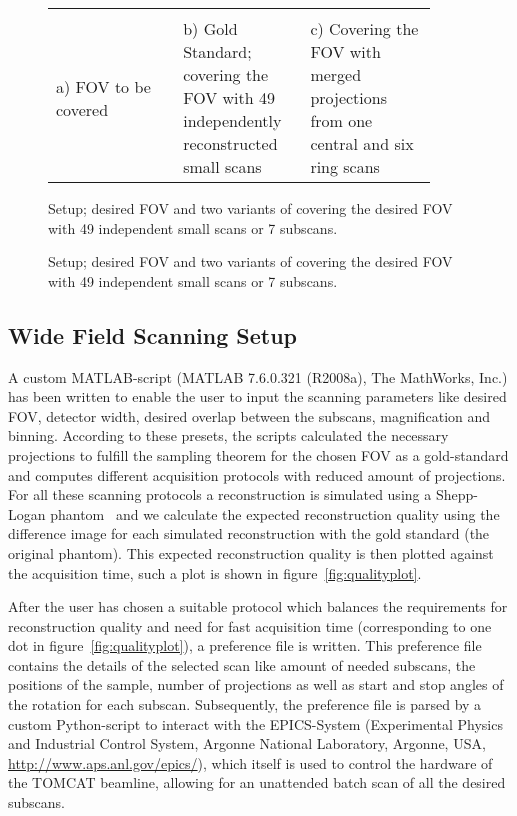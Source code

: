 \ifiucr
	\begin{figure}%
		\centering%
		\caption{Setup; desired FOV and two variants of covering the desired FOV with 49 independent small scans or 7 subscans.}%
		\begin{tabular}{p{0.3\linewidth}p{0.3\linewidth}p{0.3\linewidth}}%
			 &%
			 &%
			 \\%
			a) FOV to be covered &%
			b) Gold Standard; covering the FOV with 49 independently reconstructed small scans &%
			c) Covering the FOV with merged projections from one central and six ring scans \\%
		\end{tabular}%
		\label{fig:Setup7SubScans}%
	\end{figure}%
\else
	\begin{figure*}[htp]
		\centering%
		\caption{Setup; desired FOV and two variants of covering the desired FOV with 49 independent small scans or 7 subscans.}%
		\label{fig:Setup7SubScans}%
	\end{figure*}
\fi

\subsection{Wide Field Scanning Setup}%
\label{subsec:wfs-setup}%
A custom MATLAB-script (MATLAB\textsuperscript{\textregistered} 7.6.0.321 (R2008a), The MathWorks, Inc.) has been written to enable the user to input the scanning parameters like desired FOV, detector width, desired overlap between the subscans, magnification and binning. According to these presets, the scripts calculated the necessary projections to fulfill the sampling theorem for the chosen FOV as a gold-standard and computes different acquisition protocols with reduced amount of projections. For all these scanning protocols a reconstruction is simulated using a Shepp-Logan phantom~\cite{Shepp1974} and we calculate the expected reconstruction quality using the difference image for each simulated reconstruction with the gold standard (the original phantom). This expected reconstruction quality is then plotted against the acquisition time, such a plot is shown in figure~\ref{fig:qualityplot}.

After the user has chosen a suitable protocol which balances the requirements for reconstruction quality and need for fast acquisition time (corresponding to one dot in figure~\ref{fig:qualityplot}), a preference file is written. This preference file contains the details of the selected scan like amount of needed subscans, the positions of the sample, number of projections as well as start and stop angles of the rotation for each subscan. Subsequently, the preference file is parsed by a custom Python-script to interact with the EPICS-System (Experimental Physics and Industrial Control System, Argonne National Laboratory, Argonne, USA, \url{http://www.aps.anl.gov/epics/}), which itself is used to control the hardware of the TOMCAT beamline, allowing for an unattended batch scan of all the desired subscans.

